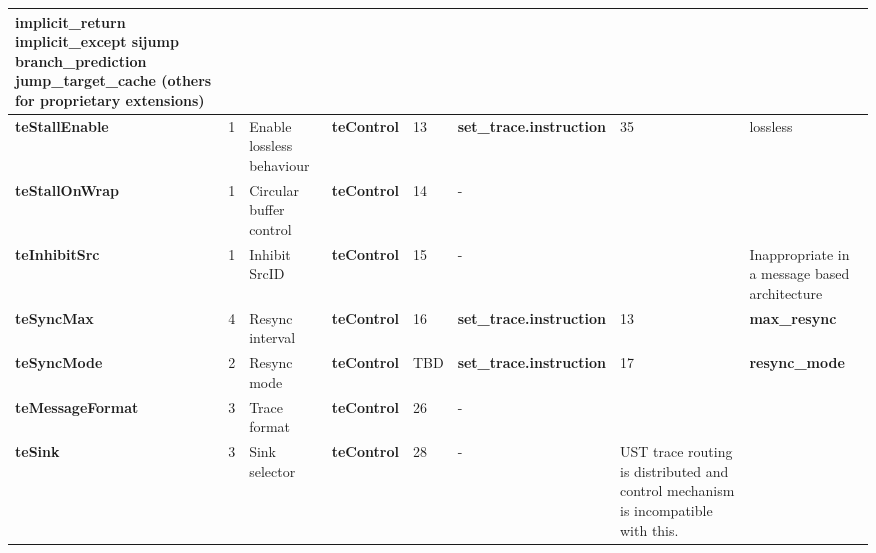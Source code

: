 \begin{table}[htp]
\begin{tabulary}{\textwidth}{|l|l|p{15mm}|l|p{10mm}|l|p{15mm}|p{15mm}}
    \textbf{implicit\_return}\newline
    \textbf{implicit\_except}\newline
    \textbf{sijump}\newline
    \textbf{branch\_prediction}\newline
    \textbf{jump\_target\_cache}\newline
    (others for proprietary extensions)\\
    \hline
    \textbf{teStallEnable} & 1 & Enable lossless behaviour & \textbf{teControl} & 13 & \textbf{set\_trace.instruction} & 35 & lossless\\
    \hline
    \textbf{teStallOnWrap} & 1 & Circular buffer control & \textbf{teControl} & 14	& - & \\
    \hline
    \textbf{teInhibitSrc} & 1 & Inhibit SrcID & \textbf{teControl} & 15 & - & &  Inappropriate in a message based architecture \\
    \hline
    \textbf{teSyncMax} & 4 & Resync interval & \textbf{teControl} & 16 & \textbf{set\_trace.instruction} & 13 & \textbf{max\_resync}\\
    \hline
    \textbf{teSyncMode} & 2 &Resync mode & \textbf{teControl} & TBD & \textbf{set\_trace.instruction} & 17 & \textbf{resync\_mode} \\
    \hline
    \textbf{teMessageFormat} & 3 & Trace format & \textbf{teControl} & 26 & - & & \\
    \hline
    \textbf{teSink} & 3 & Sink selector & \textbf{teControl} & 28 & - & UST trace routing is distributed and control mechanism is incompatible with this.\\
    \hline
  \end{tabulary}
\end{table}



